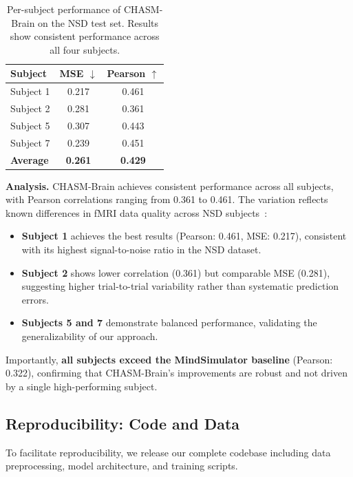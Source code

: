 \begin{table}[h]
\centering
\caption{Per-subject performance of CHASM-Brain on the NSD test set.
Results show consistent performance across all four subjects.}
\label{tab:supp_per_subject}
\begin{tabular}{lcc}
\toprule
\textbf{Subject} & \textbf{MSE} $\downarrow$ & \textbf{Pearson} $\uparrow$ \\
\midrule
Subject 1 & 0.217 & 0.461 \\
Subject 2 & 0.281 & 0.361 \\
Subject 5 & 0.307 & 0.443 \\
Subject 7 & 0.239 & 0.451 \\
\midrule
\textbf{Average} & \textbf{0.261} & \textbf{0.429} \\
\bottomrule
\end{tabular}
\end{table}

\textbf{Analysis.}
CHASM-Brain achieves consistent performance across all subjects, with Pearson correlations
ranging from 0.361 to 0.461. The variation reflects known differences in fMRI data quality
across NSD subjects~\cite{allen2022massive}:

\begin{itemize}
    \item \textbf{Subject 1} achieves the best results (Pearson: 0.461, MSE: 0.217),
          consistent with its highest signal-to-noise ratio in the NSD dataset.
    \item \textbf{Subject 2} shows lower correlation (0.361) but comparable MSE (0.281),
          suggesting higher trial-to-trial variability rather than systematic prediction errors.
    \item \textbf{Subjects 5 and 7} demonstrate balanced performance,
          validating the generalizability of our approach.
\end{itemize}

Importantly, \textbf{all subjects exceed the MindSimulator baseline} (Pearson: 0.322),
confirming that CHASM-Brain's improvements are robust and not driven by a single high-performing subject.


\subsection{Reproducibility: Code and Data}
\label{sec:supp_reproducibility}

To facilitate reproducibility, we release our complete codebase including
data preprocessing, model architecture, and training scripts.

